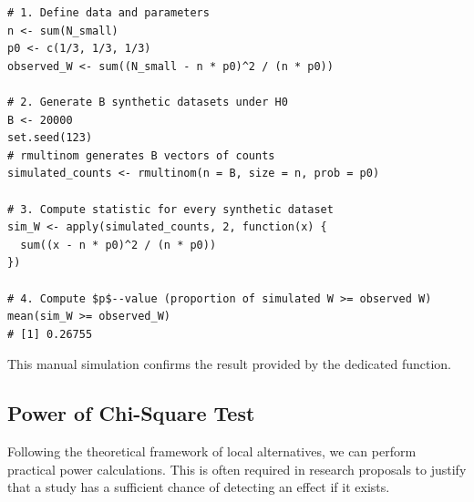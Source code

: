 \begin{verbatim}
# 1. Define data and parameters
n <- sum(N_small)
p0 <- c(1/3, 1/3, 1/3)
observed_W <- sum((N_small - n * p0)^2 / (n * p0))

# 2. Generate B synthetic datasets under H0
B <- 20000
set.seed(123)
# rmultinom generates B vectors of counts
simulated_counts <- rmultinom(n = B, size = n, prob = p0)

# 3. Compute statistic for every synthetic dataset
sim_W <- apply(simulated_counts, 2, function(x) {
  sum((x - n * p0)^2 / (n * p0))
})

# 4. Compute $p$--value (proportion of simulated W >= observed W)
mean(sim_W >= observed_W)
# [1] 0.26755
\end{verbatim}

This manual simulation confirms the result provided by the dedicated function.

\subsection{Power of Chi-Square Test}
\label{sub:Power_Calculation}

Following the theoretical framework of local alternatives, we can perform practical power calculations. This is often required in research proposals to justify that a study has a sufficient chance of detecting an effect if it exists.

